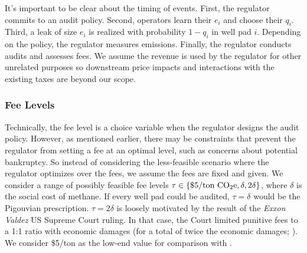 It's important to be clear about the timing of events.
First, the regulator commits to an audit policy.
Second, operators learn their \(e_i\) and choose their \(q_i\).
Third, a leak of size \(e_i\) is realized with probability \(1 - q_i\) in well pad \(i\).
Depending on the policy, the regulator measures emissions.
Finally, the regulator conducts audits and assesses fees.
We assume the revenue is used by the regulator for other unrelated purposes so downstream price impacts and interactions with the existing taxes are beyond our scope.

\subsubsection{Fee Levels}
\label{sec:fee-levels}
Technically, the fee level is a choice variable when the regulator designs the audit policy.
However, as mentioned earlier, there may be constraints that prevent the regulator from setting a fee at an optimal level, such as concerns about potential bankruptcy.
So instead of considering the less-feasible scenario where the regulator optimizes over the fees, we assume the fees are fixed and given.
We consider a range of possibly feasible fee levels
\(\tau \in \{\text{\$5/ton \ce{CO2e}}, \delta, 2 \delta\}\), where \(\delta\) is the social cost of methane.
If every well pad could be audited, \(\tau = \delta\) would be the Pigouvian prescription.
\(\tau = 2 \delta\) is loosely motivated by the result of the \textit{Exxon Valdez} US Supreme Court ruling.
In that case, the Court limited punitive fees to a 1:1 ratio with economic damages (for a total of twice the economic damages; \cite{exxon_v_baker:2008}).
We consider \$5/ton  as the low-end value for comparison with \textcite{Marks:2021}.


